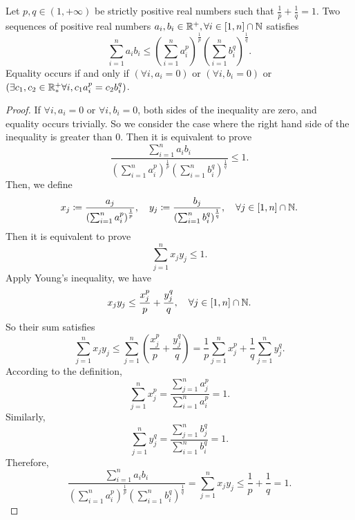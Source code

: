 \begin{theorem}\label{holder}
Let \(p,q\in(1,+\infty)\) be strictly positive real numbers such that \(\frac{1}{p}+\frac{1}{q}=1\).
Two sequences of positive real numbers \(a_i,b_i\in\mathbb{R}^+,\forall i\in[1,n]\cap\mathbb{N}\) satisfies
\begin{equation}
\sum_{i=1}^n a_ib_i\leq\left(\sum_{i=1}^n a_i^p\right)^{\frac{1}{p}}\left(\sum_{i=1}^n b_i^q\right)^{\frac{1}{q}}.
\end{equation}
Equality occurs if and only if \((\forall i, a_i=0)\) or \((\forall i, b_i=0)\) or \((\exists c_1,c_2\in\mathbb{R}_*^+\forall i,c_1a_i^p=c_2b_i^q)\).
\end{theorem}
\begin{proof}
If \(\forall i, a_i=0\) or \(\forall i, b_i=0\), both sides of the inequality are zero, and equality occurs trivially.
So we consider the case where the right hand side of the inequality is greater than 0.
Then it is equivalent to prove
\[ \frac{\sum_{i=1}^n a_ib_i}{\left(\sum_{i=1}^n a_i^p\right)^{\frac{1}{p}}\left(\sum_{i=1}^n b_i^q\right)^{\frac{1}{q}}}\leq1. \]
Then, we define
\[ x_j\coloneqq\frac{a_j}{\left(\sum_{i=1}^n a_i^p\right)^{\frac{1}{p}}}, \quad y_j\coloneqq\frac{b_j}{\left(\sum_{i=1}^n b_i^q\right)^{\frac{1}{q}}}, \quad \forall j\in[1,n]\cap\mathbb{N}. \]
Then it is equivalent to prove
\[ \sum_{j=1}^n x_jy_j\leq1. \]
Apply Young's inequality, we have
\[ x_jy_j\leq\frac{x_j^p}{p}+\frac{y_j^q}{q}, \quad \forall j\in[1,n]\cap\mathbb{N}. \]
So their sum satisfies
\[ \sum_{j=1}^n x_jy_j\leq \sum_{j=1}^n\left(\frac{x_j^p}{p}+\frac{y_j^q}{q}\right)=\frac{1}{p}\sum_{j=1}^n x_j^p+\frac{1}{q}\sum_{j=1}^n y_j^q. \]
According to the definition,
\[ \sum_{j=1}^n x_j^p=\frac{\sum_{j=1}^n a_j^p}{\sum_{i=1}^n a_i^p}=1. \]
Similarly,
\[ \sum_{j=1}^n y_j^q=\frac{\sum_{j=1}^n b_j^q}{\sum_{i=1}^n b_i^q}=1. \]
Therefore,
\[ \frac{\sum_{i=1}^n a_ib_i}{\left(\sum_{i=1}^n a_i^p\right)^{\frac{1}{p}}\left(\sum_{i=1}^n b_i^q\right)^{\frac{1}{q}}}=\sum_{j=1}^n x_jy_j\leq\frac{1}{p}+\frac{1}{q}=1. \]
\cite{utx}
\end{proof}



